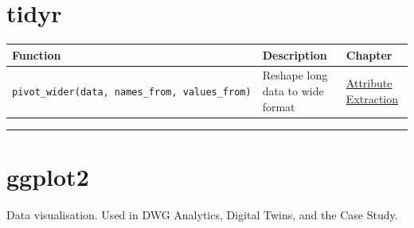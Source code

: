 \documentclass[
  11pt,
  letterpaper,
  DIV=11,
  numbers=noendperiod]{scrreprt}
\begin{document}
\section{tidyr}\label{tidyr}

\begin{longtable}[]{@{}
  >{\raggedright\arraybackslash}p{}
  >{\raggedright\arraybackslash}p{}
  >{\raggedright\arraybackslash}p{}@{}}
\toprule\noalign{}
\begin{minipage}[b]{\linewidth}\raggedright
Function
\end{minipage} & \begin{minipage}[b]{\linewidth}\raggedright
Description
\end{minipage} & \begin{minipage}[b]{\linewidth}\raggedright
Chapter
\end{minipage} \\
\midrule\noalign{}
\endhead
\bottomrule\noalign{}
\endlastfoot
\texttt{pivot\_wider(data,\ names\_from,\ values\_from)} & Reshape long
data to wide format & \hyperref[attribute-extraction]{Attribute
Extraction} \\
\end{longtable}

\begin{center}\rule{0.5\linewidth}{0.5pt}\end{center}

\section{ggplot2}\label{ggplot2}

Data visualisation. Used in DWG Analytics, Digital Twins, and the Case
Study.
\end{document}
